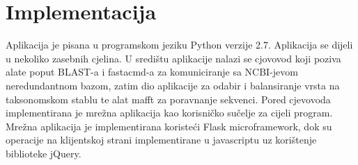 \chapter{Implementacija}
\label{chap:implementacija}


Aplikacija je pisana u programskom jeziku Python verzije 2.7. Aplikacija se
dijeli u nekoliko zasebnih cjelina. U središtu aplikacije nalazi se cjovovod
koji poziva alate poput BLAST-a i fastacmd-a za komuniciranje sa NCBI-jevom
neredundantnom bazom, zatim dio aplikacije za odabir i balansiranje vrsta na
taksonomskom stablu te alat mafft\cite{mafft} za poravnanje sekvenci.  Pored
cjevovoda implementirana je mrežna aplikacija kao korisničko sučelje za cijeli
program.  Mrežna aplikacija je implementirana koristeći Flask microframework,
dok su operacije na klijentskoj strani implementirane u javascriptu uz
korištenje biblioteke jQuery.

